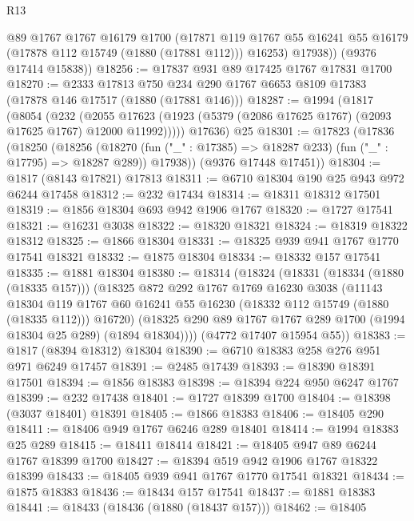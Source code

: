 \begin{lexlean}{R13}
\begin{coremodule}
          @89
          @1767
          @1767
          @16179
          @1700
          (@17871
            @119
            @1767
            @55
            @16241
            @55
            @16179
            (@17878 @112 @15749 (@1880 (@17881 @112)))
            @16253)
          @17938))
      (@9376 @17414 @15838))
@18256 := @17837 @931 @89 @17425 @1767 @17831 @1700
@18270 := @2333
    @17813
    @750
    @234
    @290
    @1767
    @6653
    @8109
    @17383
    (@17878 @146 @17517 (@1880 (@17881 @146)))
@18287 := @1994
    (@1817
      (@8054
        (@232
          (@2055 @17623 (@1923 (@5379 (@2086 @17625 @1767) (@2093 @17625 @1767) @12000 @11992)))))
      @17636)
    @25
@18301 := @17823
    (@17836
      (@18250
        (@18256
          (@18270 (fun ("_" : @17385) => @18287 @233) (fun ("_" : @17795) => @18287 @289))
          @17938))
      (@9376 @17448 @17451))
@18304 := @1817 (@8143 @17821) @17813
@18311 := @6710 @18304 @190 @25 @943 @972 @6244 @17458
@18312 := @232 @17434
@18314 := @18311 @18312 @17501
@18319 := @1856 @18304 @693 @942 @1906 @1767
@18320 := @1727 @17541
@18321 := @16231 @3038
@18322 := @18320 @18321
@18324 := @18319 @18322 @18312
@18325 := @1866 @18304
@18331 := @18325 @939 @941 @1767 @1770 @17541 @18321
@18332 := @1875 @18304
@18334 := @18332 @157 @17541
@18335 := @1881 @18304
@18380 := @18314
    (@18324
      (@18331
        (@18334 (@1880 (@18335 @157)))
        (@18325
          @872
          @292
          @1767
          @1769
          @16230
          @3038
          (@11143
            @18304
            @119
            @1767
            @60
            @16241
            @55
            @16230
            (@18332 @112 @15749 (@1880 (@18335 @112)))
            @16720)
          (@18325 @290 @89 @1767 @1767 @289 @1700 (@1994 @18304 @25 @289) (@1894 @18304))))
      (@4772 @17407 @15954 @55))
@18383 := @1817 (@8394 @18312) @18304
@18390 := @6710 @18383 @258 @276 @951 @971 @6249 @17457
@18391 := @2485 @17439
@18393 := @18390 @18391 @17501
@18394 := @1856 @18383
@18398 := @18394 @224 @950 @6247 @1767
@18399 := @232 @17438
@18401 := @1727 @18399 @1700
@18404 := @18398 (@3037 @18401) @18391
@18405 := @1866 @18383
@18406 := @18405 @290
@18411 := @18406 @949 @1767 @6246 @289 @18401
@18414 := @1994 @18383 @25 @289
@18415 := @18411 @18414
@18421 := @18405 @947 @89 @6244 @1767 @18399 @1700
@18427 := @18394 @519 @942 @1906 @1767 @18322 @18399
@18433 := @18405 @939 @941 @1767 @1770 @17541 @18321
@18434 := @1875 @18383
@18436 := @18434 @157 @17541
@18437 := @1881 @18383
@18441 := @18433 (@18436 (@1880 (@18437 @157)))
@18462 := @18405

\end{coremodule}
\end{lexlean}
